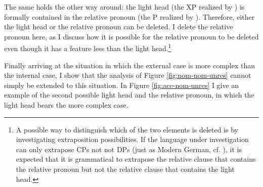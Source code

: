 The same holds the other way around: the light head (the XP realized by ) is formally contained in the relative pronoun (the P realized by ). Therefore, either the light head or the relative pronoun can be deleted. I delete the relative pronoun here, as I discuss how it is possible for the relative pronoun to be deleted even though it has a feature less than the light head.\footnote{A possible way to distinguish which of the two elements is deleted is by investigating extraposition possibilities. If the language under investigation can only extrapose CPs not not DPs (just as Modern German, cf. \citealt{vanriemsdijk2006}), it is expected that it is grammatical to extrapose the relative clause that contains the relative pronoun but not the relative clause that contains the light head.}

Finally arriving at the situation in which the external case is more complex than the internal case, I show that the analysis of Figure \ref{fig:nom-nom-unres} cannot simply be extended to this situation.
In Figure \ref{fig:acc-nom-unres} I give an example of the second possible light head and the relative pronoun, in which the light head bears the more complex case.

